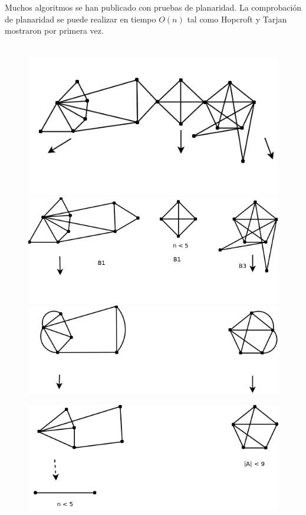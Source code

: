 \documentclass[10pt,a5paper]{book}
\begin{document}
Muchos algoritmos se han publicado con pruebas de planaridad. La comprobación de planaridad se puede realizar en tiempo $O(n)$ tal como Hopcroft y Tarjan\cite{g} mostraron por primera vez.

\begin{figure}[H]
\caption{ }
\hrulefill{}\\
  \includegraphics[scale=.4]{Fig3_17_a.png}
  \includegraphics[scale=.4]{Fig3_17_b.png}
  \includegraphics[scale=.4]{Fig3_17_c.png}
\end{figure}
\pagebreak
\begin{figure}[H]
\includegraphics[scale=.4]{Fig3_17_d.png}
\end{figure}
\hrulefill{}\\
\end{document}
